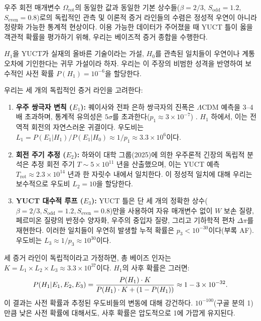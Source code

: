 \documentclass[11pt,a4paper]{article}
\begin{document}
우주 회전 매개변수 \(\Omega_{\mathrm{rot}}\)의 동일한 값과 동일한 기본 상수들(\(\beta=2/3\), \(S_{\mathrm{odd}}=1.2\), \(S_{\mathrm{even}}=0.8\))로의 독립적인 관측 및 이론적 증거 라인들의 수렴은 정성적 우연이 아니라 정량화 가능한 통계적 현상이다. 이용 가능한 데이터가 주어졌을 때 YUCT 틀이 옳을 객관적 확률을 평가하기 위해, 우리는 베이즈적 증거 종합을 수행한다.

\(H_1\)을 YUCT가 실재의 올바른 기술이라는 가설, \(H_0\)를 관측된 일치들이 우연이나 계통 오차에 기인한다는 귀무 가설이라 하자. 우리는 이 주장의 비범한 성격을 반영하여 보수적인 사전 확률 \(P(H_1) = 10^{-6}\)을 할당한다.

우리는 세 개의 독립적인 증거 라인을 고려한다:
\begin{enumerate}
	\item \textbf{우주 쌍극자 변칙 (\(E_1\)):} 퀘이사와 전파 은하 쌍극자의 진폭은 \(\Lambda\)CDM 예측을 3–4배 초과하며, 통계적 유의성은 \(5\sigma\)를 초과한다(\(p_1 \approx 3 \times 10^{-7}\)) \cite{Secrest2025, Singal2024}. \(H_1\) 하에서, 이는 전역적 회전의 자연스러운 귀결이다. 우도비는 \(L_1 = P(E_1|H_1)/P(E_1|H_0) \approx 1/p_1 \approx 3.3 \times 10^6\)이다.
	
	\item \textbf{회전 주기 추정 (\(E_2\)):} 하와이 대학 그룹(2025)에 의한 우주론적 긴장의 독립적 분석은 추정 회전 주기 \(T \sim 5 \times 10^{11}\) 년을 산출했으며, 이는 YUCT 예측 \(T_{\mathrm{rot}} \approx 2.3 \times 10^{14}\) 년과 한 자릿수 내에서 일치한다. 이 정성적 일치에 대해 우리는 보수적으로 우도비 \(L_2 = 10\)을 할당한다.
	
	\item \textbf{YUCT 대수적 루프 (\(E_3\)):} YUCT 틀은 단 세 개의 정확한 상수(\(\beta=2/3, S_{\mathrm{odd}}=1.2, S_{\mathrm{even}}=0.8\))만을 사용하여 자유 매개변수 없이 \(W\) 보손 질량, 페르미온 질량의 반정수 양자화, 우주의 중입자 질량, 그리고 기하학적 편차 \(\Delta\pi\)를 재현한다. 이러한 일치들이 우연히 발생할 누적 확률은 \(p_3 < 10^{-30}\)이다(부록 AF). 우도비는 \(L_3 \approx 1/p_3 \approx 10^{30}\)이다.
\end{enumerate}

세 증거 라인이 독립적이라고 가정하면, 총 베이즈 인자는 \(K = L_1 \times L_2 \times L_3 \approx 3.3 \times 10^{37}\)이다. \(H_1\)의 사후 확률은 그러면:
\begin{equation}
	\scriptsize
	P(H_1 | E_1, E_2, E_3) = \frac{P(H_1) \cdot K}{P(H_1) \cdot K + (1 - P(H_1))} \approx 1 - 3 \times 10^{-32}.
\end{equation}
이 결과는 사전 확률과 추정된 우도비들의 변동에 대해 강건하다. \(10^{-100}\)(구골 분의 1)만큼 낮은 사전 확률에 대해서도, 사후 확률은 압도적으로 1에 가깝게 유지된다.
\end{document}
